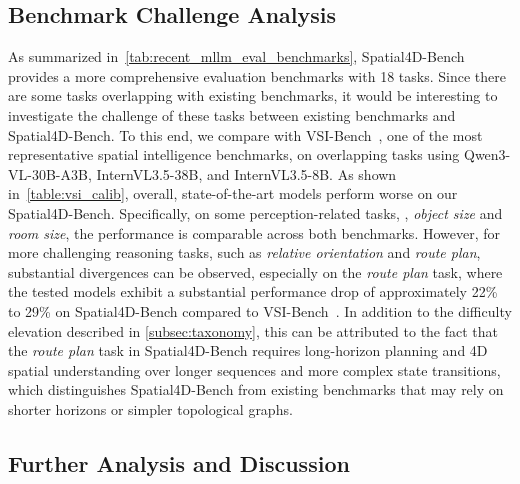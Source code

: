 \begin{table}
\caption{Comparison with VSI-Bench~\cite{Yang_2025_CVPR} on overlapping tasks.
Overall, state-of-the-art models perform worse on our Spatial4D-Bench, especially on the redefined \textit{route plan} task.
These results indicate that our Spatial4D-Bench is more challenging than VSI-Bench~\cite{Yang_2025_CVPR} on overlapping tasks.
}
\label{table:vsi_calib}
\end{table}



\subsection{Benchmark Challenge Analysis}
As summarized in~\cref{tab:recent_mllm_eval_benchmarks}, Spatial4D-Bench provides a more comprehensive evaluation benchmarks with 18 tasks.
Since there are some tasks overlapping with existing benchmarks, it would be interesting to investigate the challenge of these tasks between existing benchmarks and Spatial4D-Bench.
To this end, we compare with VSI-Bench~\cite{Yang_2025_CVPR}, one of the most representative spatial intelligence benchmarks, on overlapping tasks using Qwen3-VL-30B-A3B, InternVL3.5-38B, and InternVL3.5-8B.
As shown in~\cref{table:vsi_calib}, overall, state-of-the-art models perform worse on our Spatial4D-Bench.
Specifically, on some perception-related tasks, \eg, \textit{object size} and \textit{room size}, the performance is comparable across both benchmarks.
However, for more challenging reasoning tasks, such as \textit{relative orientation} and \textit{route plan}, substantial divergences can be observed, especially on the \textit{route plan} task, where the tested models exhibit a substantial performance drop of approximately 22\% to 29\% on Spatial4D-Bench compared to VSI-Bench~\cite{Yang_2025_CVPR}.
In addition to the difficulty elevation described in \cref{subsec:taxonomy}, this can be attributed to the fact that the \textit{route plan} task in Spatial4D-Bench requires long-horizon planning and 4D spatial understanding over longer sequences and more complex state transitions, which distinguishes Spatial4D-Bench from existing benchmarks that may rely on shorter horizons or simpler topological graphs.




\subsection{Further Analysis and Discussion}



